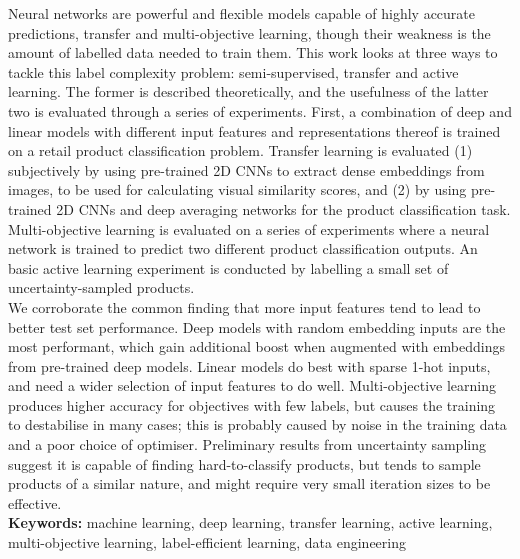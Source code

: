 \noindent
Neural networks are powerful and flexible models capable of highly accurate predictions, transfer and multi-objective learning, though their weakness is the amount of labelled data needed to train them.
This work looks at three ways to tackle this label complexity problem: semi-supervised, transfer and active learning.
The former is described theoretically, and the usefulness of the latter two is evaluated through a series of experiments.
First, a combination of deep and linear models with different input features and representations thereof is trained on a retail product classification problem.
Transfer learning is evaluated (1) subjectively by using pre-trained 2D CNNs to extract dense embeddings from images, to be used for calculating visual similarity scores, and (2) by using pre-trained 2D CNNs and deep averaging networks for the product classification task.
Multi-objective learning is evaluated on a series of experiments where a neural network is trained to predict two different product classification outputs.
An basic active learning experiment is conducted by labelling a small set of uncertainty-sampled products.
\\

We corroborate the common finding that more input features tend to lead to better test set performance.
Deep models with random embedding inputs are the most performant, which gain additional boost when augmented with embeddings from pre-trained deep models.
Linear models do best with sparse 1-hot inputs, and need a wider selection of input features to do well.
Multi-objective learning produces higher accuracy for objectives with few labels, but causes the training to destabilise in many cases; this is probably caused by noise in the training data and a poor choice of optimiser.
Preliminary results from uncertainty sampling suggest it is capable of finding hard-to-classify products, but tends to sample products of a similar nature, and might require very small iteration sizes to be effective.
\\

\noindent
\textbf{Keywords:} machine learning, deep learning, transfer learning, active learning, multi-objective learning, label-efficient learning, data engineering
